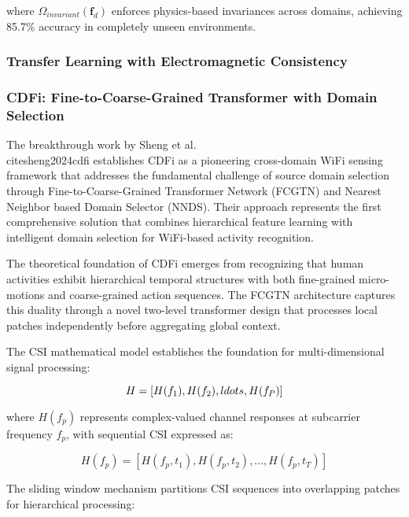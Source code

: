 \documentclass[journal]{IEEEtran}
\begin{document}
where $\Omega_{invariant}(\mathbf{f}_d)$ enforces physics-based invariances across domains, achieving 85.7\% accuracy in completely unseen environments.

\subsubsection{Transfer Learning with Electromagnetic Consistency}

\subsubsection{CDFi: Fine-to-Coarse-Grained Transformer with Domain Selection}

The breakthrough work by Sheng et al. \\cite{sheng2024cdfi} establishes CDFi as a pioneering cross-domain WiFi sensing framework that addresses the fundamental challenge of source domain selection through Fine-to-Coarse-Grained Transformer Network (FCGTN) and Nearest Neighbor based Domain Selector (NNDS). Their approach represents the first comprehensive solution that combines hierarchical feature learning with intelligent domain selection for WiFi-based activity recognition.

The theoretical foundation of CDFi emerges from recognizing that human activities exhibit hierarchical temporal structures with both fine-grained micro-motions and coarse-grained action sequences. The FCGTN architecture captures this duality through a novel two-level transformer design that processes local patches independently before aggregating global context.

The CSI mathematical model establishes the foundation for multi-dimensional signal processing:

\begin{equation}
H = [H(f_1), H(f_2), \\ldots, H(f_P)]
\label{eq:cdfi_csi_model}
\end{equation}

where $H(f_p)$ represents complex-valued channel responses at subcarrier frequency $f_p$, with sequential CSI expressed as:

\begin{equation}
H(f_p) = [H(f_p, t_1), H(f_p, t_2), \ldots, H(f_p, t_T)]
\label{eq:cdfi_sequential_csi}
\end{equation}

The sliding window mechanism partitions CSI sequences into overlapping patches for hierarchical processing:
\end{document}
